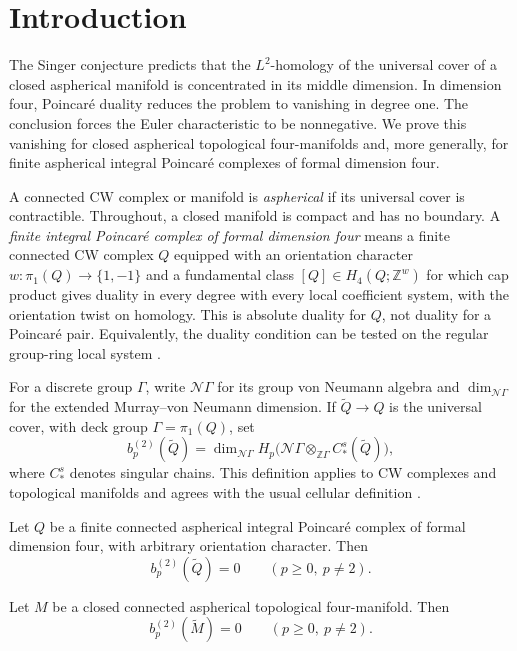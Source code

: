 \section{Introduction}\label{sec:introduction}
The Singer conjecture predicts that the $L^2$-homology of the universal
cover of a closed aspherical manifold is concentrated in its middle
dimension. In dimension four, Poincar\'e duality reduces the problem to
vanishing in degree one. The conclusion forces the Euler characteristic
to be nonnegative. We prove this vanishing for closed aspherical
topological four-manifolds
and, more generally, for finite aspherical integral Poincar\'e complexes
of formal dimension four.

A connected CW complex or manifold is \emph{aspherical} if its universal
cover is contractible. Throughout, a closed manifold is compact and has
no boundary. A \emph{finite integral Poincar\'e complex of formal dimension
four} means a finite connected CW complex $Q$ equipped with an orientation
character $w:\pi_1(Q)\to\{1,-1\}$ and a fundamental class
$[Q]\in H_4(Q;\mathbb Z^w)$ for which cap product gives duality in every
degree with every local coefficient system, with the orientation twist
on homology. This is absolute duality for $Q$, not duality for a
Poincar\'e pair. Equivalently, the duality condition can be tested on the
regular group-ring local system \cite[Lemma~1.1]{Wall1967}.

For a discrete group $\Gamma$, write $\mathcal N\Gamma$ for its group
von Neumann algebra and $\dim_{\mathcal N\Gamma}$ for the extended
Murray--von Neumann dimension. If $\widetilde Q\to Q$ is the universal
cover, with deck group $\Gamma=\pi_1(Q)$, set
\[
 b_p^{(2)}(\widetilde Q)
 =\dim_{\mathcal N\Gamma}H_p\bigl(
 \mathcal N\Gamma\otimes_{\mathbb Z\Gamma}C_*^s(\widetilde Q)\bigr),
\]
where $C_*^s$ denotes singular chains. This definition applies to
CW complexes and topological manifolds and agrees with the usual
cellular definition
\cite[Definition~6.50 and Lemmas~6.51--6.53]{Luck2002}.

\begin{theorem}\label{thm:main}
Let $Q$ be a finite connected aspherical integral Poincar\'e complex of
formal dimension four, with arbitrary orientation character. Then
\[
 b_p^{(2)}(\widetilde Q)=0\qquad(p\ge0,\ p\ne2).
\]
\end{theorem}

\begin{corollary}\label{cor:singer-manifolds}
Let $M$ be a closed connected aspherical topological four-manifold. Then
\[
 b_p^{(2)}(\widetilde M)=0\qquad(p\ge0,\ p\ne2).
\]
\end{corollary}

